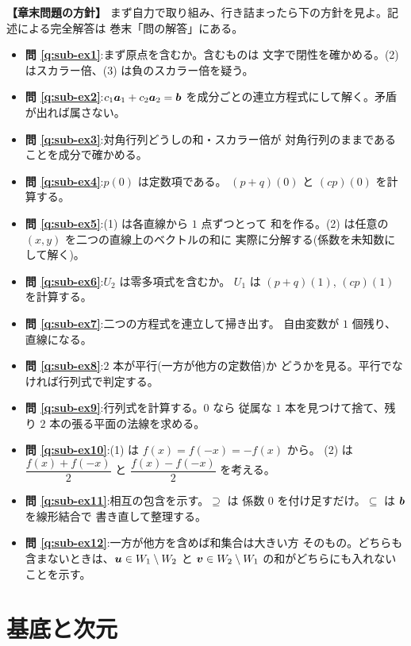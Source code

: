 \bigskip
{\small
\noindent\textbf{【章末問題の方針】}\quad
まず自力で取り組み、行き詰まったら下の方針を見よ。記述による完全解答は
巻末「問の解答」にある。
\begin{itemize}
\item \textbf{問 \ref{q:sub-ex1}}:まず原点を含むか。含むものは
文字で閉性を確かめる。(2) はスカラー倍、(3) は負のスカラー倍を疑う。
\item \textbf{問 \ref{q:sub-ex2}}:$c_1\bm{a}_1 + c_2\bm{a}_2 = \bm{b}$
を成分ごとの連立方程式にして解く。矛盾が出れば属さない。
\item \textbf{問 \ref{q:sub-ex3}}:対角行列どうしの和・スカラー倍が
対角行列のままであることを成分で確かめる。
\item \textbf{問 \ref{q:sub-ex4}}:$p(0)$ は定数項である。
$(p + q)(0)$ と $(cp)(0)$ を計算する。
\item \textbf{問 \ref{q:sub-ex5}}:(1) は各直線から $1$ 点ずつとって
和を作る。(2) は任意の $(x, y)$ を二つの直線上のベクトルの和に
実際に分解する(係数を未知数にして解く)。
\item \textbf{問 \ref{q:sub-ex6}}:$U_2$ は零多項式を含むか。
$U_1$ は $(p+q)(1)$, $(cp)(1)$ を計算する。
\item \textbf{問 \ref{q:sub-ex7}}:二つの方程式を連立して掃き出す。
自由変数が $1$ 個残り、直線になる。
\item \textbf{問 \ref{q:sub-ex8}}:$2$ 本が平行(一方が他方の定数倍)か
どうかを見る。平行でなければ行列式で判定する。
\item \textbf{問 \ref{q:sub-ex9}}:行列式を計算する。$0$ なら
従属な $1$ 本を見つけて捨て、残り $2$ 本の張る平面の法線を求める。
\item \textbf{問 \ref{q:sub-ex10}}:(1) は $f(x) = f(-x) = -f(x)$ から。
(2) は $\dfrac{f(x) + f(-x)}{2}$ と $\dfrac{f(x) - f(-x)}{2}$ を考える。
\item \textbf{問 \ref{q:sub-ex11}}:相互の包含を示す。$\supseteq$ は
係数 $0$ を付け足すだけ。$\subseteq$ は $\bm{b}$ を線形結合で
書き直して整理する。
\item \textbf{問 \ref{q:sub-ex12}}:一方が他方を含めば和集合は大きい方
そのもの。どちらも含まないときは、$\bm{u} \in W_1 \setminus W_2$ と
$\bm{v} \in W_2 \setminus W_1$ の和がどちらにも入れないことを示す。
\end{itemize}
}

\chapter{基底と次元}\label{chap:basis}

